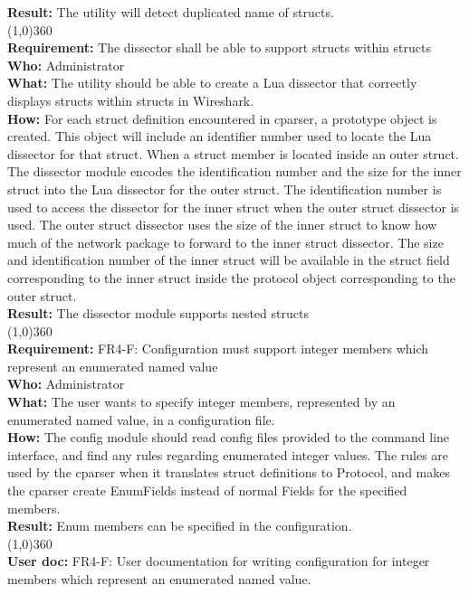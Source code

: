 \textbf{Result:} The utility will detect duplicated name of structs.\\
\line(1,0){360}\\
\textbf{Requirement:} The dissector shall be able to support structs within structs\\
\textbf{Who:} Administrator\\
\textbf{What:} The utility should be able to create a Lua dissector that correctly displays structs within structs in Wireshark. \\
\textbf{How:} For each struct definition encountered in cparser, a prototype object is created. This object will include an identifier number used to locate the Lua dissector for that struct. When a struct member is located inside an outer struct. 
The dissector module encodes the identification number and the size for the inner struct into the Lua dissector for the outer struct. The identification number is used to access the dissector for the inner struct when the outer struct dissector is used. The outer struct dissector uses the size of the inner struct to know how much of the network package to forward to the inner struct dissector.
The size and identification number of the inner struct will be available in the struct field corresponding to the inner struct inside the protocol object corresponding to the outer struct.\\
\textbf{Result:} The dissector module supports nested structs\\
\line(1,0){360}\\
\textbf{Requirement:} FR4-F: Configuration must support integer members which represent an enumerated named value\\
\textbf{Who:} Administrator\\
\textbf{What:} The user wants to specify integer members, represented by an enumerated named value, in a configuration file.\\
\textbf{How:} The config module should read config files provided to the command line interface, and find any rules regarding enumerated integer values. The rules are used by the cparser when it translates struct definitions to Protocol, and makes the cparser create EnumFields instead of normal Fields for the specified members.\\
\textbf{Result:} Enum members can be specified in the configuration.\\
\line(1,0){360}\\
\textbf{User doc:} FR4-F: User documentation for writing configuration for integer members which represent an enumerated named value.\\
